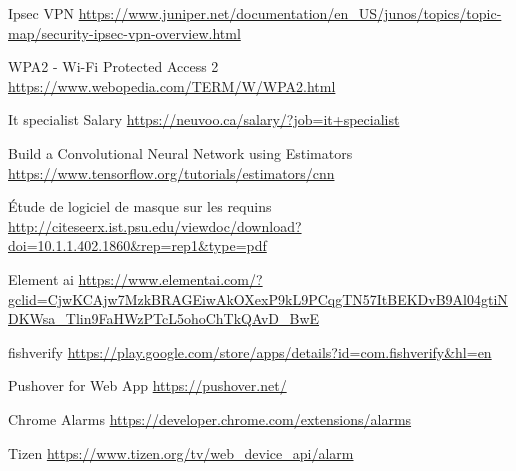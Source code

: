 \begin{thebibliographyUL}{9}
  Ipsec VPN
\url{https://www.juniper.net/documentation/en_US/junos/topics/topic-map/security-ipsec-vpn-overview.html}

  WPA2 - Wi-Fi Protected Access 2
\url{https://www.webopedia.com/TERM/W/WPA2.html}

  It specialist Salary
\url{https://neuvoo.ca/salary/?job=it+specialist}

  Build a Convolutional Neural Network using Estimators
\url{https://www.tensorflow.org/tutorials/estimators/cnn}

  Étude de logiciel de masque sur les requins
\url{http://citeseerx.ist.psu.edu/viewdoc/download?doi=10.1.1.402.1860&rep=rep1&type=pdf}

  Element ai
\url{https://www.elementai.com/?gclid=CjwKCAjw7MzkBRAGEiwAkOXexP9kL9PCqgTN57ItBEKDvB9Al04gtiNDKWsa_Tlin9FaHWzPTcL5ohoChTkQAvD_BwE}

 fishverify
\url{https://play.google.com/store/apps/details?id=com.fishverify&hl=en}

 Pushover for Web App \url{https://pushover.net/}

 Chrome Alarms \url{https://developer.chrome.com/extensions/alarms}

 Tizen \url{https://www.tizen.org/tv/web_device_api/alarm}

\end{thebibliographyUL}